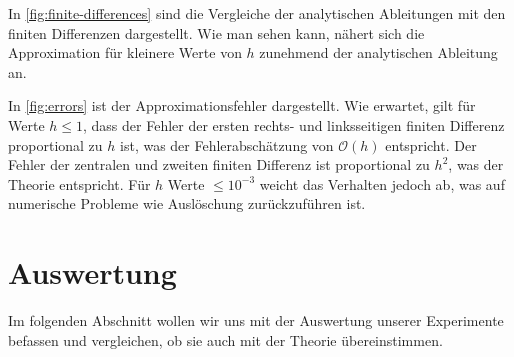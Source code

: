 \documentclass{scrartcl}
\newcommand{\BigO}{\mathcal{O}}
\theoremstyle{remark}
\begin{document}
In \autoref{fig:finite-differences} sind die Vergleiche der analytischen
Ableitungen mit den finiten Differenzen dargestellt. Wie man sehen kann, nähert
sich die Approximation für kleinere Werte von \(h\) zunehmend der analytischen
Ableitung an.

In \autoref{fig:errors} ist der Approximationsfehler dargestellt. Wie erwartet,
gilt für Werte \(h \le 1\), dass der Fehler der ersten rechts- und
linksseitigen finiten Differenz proportional zu \(h\) ist, was der
Fehlerabschätzung von \(\BigO(h)\) entspricht. Der Fehler der zentralen und
zweiten finiten Differenz ist proportional zu \(h^2\), was der Theorie
entspricht. Für \(h\) Werte \(\le 10^{-3}\) weicht das Verhalten jedoch ab, was
auf numerische Probleme wie Auslöschung zurückzuführen ist.

\section{Auswertung}
Im folgenden Abschnitt wollen wir uns mit der Auswertung unserer Experimente
befassen und vergleichen, ob sie auch mit der Theorie übereinstimmen.
\end{document}
